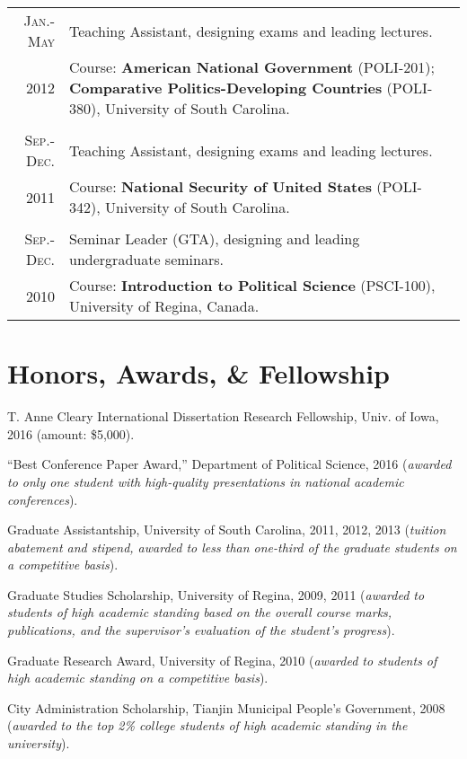 \documentclass[a4paper,10pt]{article} %
\renewenvironment{itemize}{
	\begin{list}{}{
			\setlength{\leftmargin}{1.5em}
		}
	}{
\end{list}
}
\begin{document}
\begin{longtable}{r|p{}}
			\textsc{Jan.-May}& Teaching Assistant, designing exams and leading lectures. \\
			2012& \small Course: \textbf{American National Government} (POLI-201); \textbf{Comparative Politics-Developing Countries} (POLI-380), University of South Carolina.\\
			\multicolumn{2}{c}{} \\

			\textsc{Sep.-Dec.}& Teaching Assistant, designing exams and leading lectures. \\
			2011& \small Course: \textbf{National Security of United States} (POLI-342), University of South Carolina.\\
			\multicolumn{2}{c}{} \\
			
			\textsc{Sep.-Dec.}& Seminar Leader (GTA), designing and leading undergraduate seminars. \\
			2010& \small Course: \textbf{Introduction to Political Science} (PSCI-100), University of Regina, Canada.			
		\end{longtable}

\section{Honors, Awards, \& Fellowship}
\begin{itemize}
	\item T. Anne Cleary International Dissertation Research Fellowship, Univ. of Iowa, 2016 (amount: \$5,000). 
	\item ``Best Conference Paper Award,'' Department of Political Science, 2016 (\textit{awarded to only one student with high-quality presentations in national academic conferences}).
	\item Graduate Assistantship, University of South Carolina, 2011, 2012, 2013 (\textit{tuition abatement and stipend, awarded to less than one-third of the graduate students on a competitive basis}).
	\item Graduate Studies Scholarship, University of Regina, 2009, 2011 (\textit{awarded to students of high academic standing based on the overall course marks, publications, and the supervisor's evaluation of the student's progress}).
	\item Graduate Research Award, University of Regina, 2010 (\textit{awarded to students of high academic standing on a competitive basis}).
	\item City Administration Scholarship, Tianjin Municipal People's Government, 2008 (\textit{awarded to the top 2\% college students of high academic standing in the university}).
\end{itemize}
\end{document}

